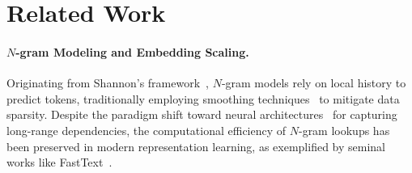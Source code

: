 \section{Related Work}

\paragraph{$N$-gram Modeling and Embedding Scaling.}
Originating from Shannon's framework~\citep{shannon1948mathematical}, $N$-gram models rely on local history to predict tokens, traditionally employing smoothing techniques~\citep{kneser1995improved,DBLP:journals/tsp/Katz87} to mitigate data sparsity. Despite the paradigm shift toward neural architectures~\citep{bengio2003neural} for capturing long-range dependencies, the computational efficiency of $N$-gram lookups has been preserved in modern representation learning, as exemplified by seminal works like FastText~\citep{bojanowski2017enriching}.

